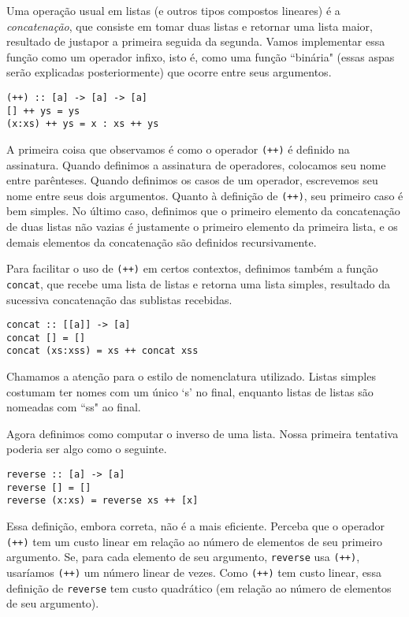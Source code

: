 \documentclass[a4paper]{article}
\begin{document}
Uma operação usual em listas (e outros tipos compostos lineares) é a \emph{concatenação}, que consiste em tomar duas listas e retornar uma lista maior, resultado de justapor a primeira seguida da segunda.
Vamos implementar essa função como um operador infixo, isto é, como uma função ``binária" (essas aspas serão explicadas posteriormente) que ocorre entre seus argumentos.

\begin{verbatim}
(++) :: [a] -> [a] -> [a]
[] ++ ys = ys
(x:xs) ++ ys = x : xs ++ ys
\end{verbatim}

A primeira coisa que observamos é como o operador \texttt{(++)} é definido na assinatura.
Quando definimos a assinatura de operadores, colocamos seu nome entre parênteses.
Quando definimos os casos de um operador, escrevemos seu nome entre seus dois argumentos.
Quanto à definição de \texttt{(++)}, seu primeiro caso é bem simples.
No último caso, definimos que o primeiro elemento da concatenação de duas listas não vazias é justamente o primeiro elemento da primeira lista, e os demais elementos da concatenação são definidos recursivamente.

Para facilitar o uso de \texttt{(++)} em certos contextos, definimos também a função \texttt{concat}, que recebe uma lista de listas e retorna uma lista simples, resultado da sucessiva concatenação das sublistas recebidas.

\begin{verbatim}
concat :: [[a]] -> [a]
concat [] = []
concat (xs:xss) = xs ++ concat xss
\end{verbatim}

Chamamos a atenção para o estilo de nomenclatura utilizado.
Listas simples costumam ter nomes com um único `s' no final, enquanto listas de listas são nomeadas com ``ss" ao final.

Agora definimos como computar o inverso de uma lista.
Nossa primeira tentativa poderia ser algo como o seguinte.

\begin{verbatim}
reverse :: [a] -> [a]
reverse [] = []
reverse (x:xs) = reverse xs ++ [x]
\end{verbatim}

Essa definição, embora correta, não é a mais eficiente.
Perceba que o operador \texttt{(++)} tem um custo linear em relação ao número de elementos de seu primeiro argumento.
Se, para cada elemento de seu argumento, \texttt{reverse} usa \texttt{(++)}, usaríamos \texttt{(++)} um número linear de vezes.
Como \texttt{(++)} tem custo linear, essa definição de \texttt{reverse} tem custo quadrático (em relação ao número de elementos de seu argumento).
\end{document}

